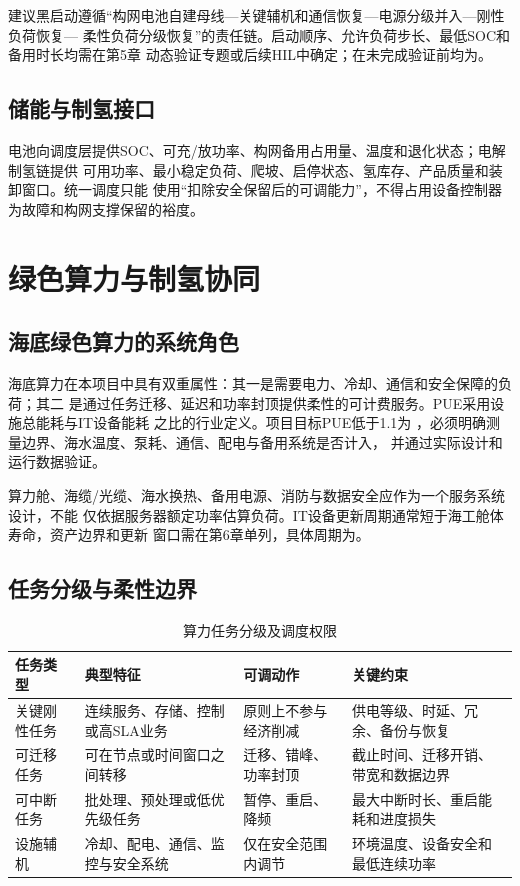 建议黑启动遵循“构网电池自建母线—关键辅机和通信恢复—电源分级并入—刚性负荷恢复—
柔性负荷分级恢复”的责任链。启动顺序、允许负荷步长、最低SOC和备用时长均需在第5章
动态验证专题或后续HIL中确定；在未完成验证前均为\assumptiontag。

\subsection{储能与制氢接口}

电池向调度层提供SOC、可充/放功率、构网备用占用量、温度和退化状态；电解制氢链提供
可用功率、最小稳定负荷、爬坡、启停状态、氢库存、产品质量和装卸窗口。统一调度只能
使用“扣除安全保留后的可调能力”，不得占用设备控制器为故障和构网支撑保留的裕度。

\section{绿色算力与制氢协同}

\subsection{海底绿色算力的系统角色}

海底算力在本项目中具有双重属性：其一是需要电力、冷却、通信和安全保障的负荷；其二
是通过任务迁移、延迟和功率封顶提供柔性的可计费服务。PUE采用设施总能耗与IT设备能耗
之比的行业定义\cite{green-grid-pue,doe-pue}。项目目标PUE低于1.1为
\assumptiontag，必须明确测量边界、海水温度、泵耗、通信、配电与备用系统是否计入，
并通过实际设计和运行数据验证。

算力舱、海缆/光缆、海水换热、备用电源、消防与数据安全应作为一个服务系统设计，不能
仅依据服务器额定功率估算负荷。IT设备更新周期通常短于海工舱体寿命，资产边界和更新
窗口需在第6章单列，具体周期为\assumptiontag。

\subsection{任务分级与柔性边界}

\begin{table}[H]
\centering
\caption{算力任务分级及调度权限}
\label{tab:c3-compute-classes}
\begin{tabularx}{\textwidth}{p{2.5cm} X X X}
\toprule
任务类型 & 典型特征 & 可调动作 & 关键约束\\
\midrule
关键刚性任务 & 连续服务、存储、控制或高SLA业务 & 原则上不参与经济削减 & 供电等级、时延、冗余、备份与恢复\\
可迁移任务 & 可在节点或时间窗口之间转移 & 迁移、错峰、功率封顶 & 截止时间、迁移开销、带宽和数据边界\\
可中断任务 & 批处理、预处理或低优先级任务 & 暂停、重启、降频 & 最大中断时长、重启能耗和进度损失\\
设施辅机 & 冷却、配电、通信、监控与安全系统 & 仅在安全范围内调节 & 环境温度、设备安全和最低连续功率\\
\bottomrule
\end{tabularx}
\end{table}

